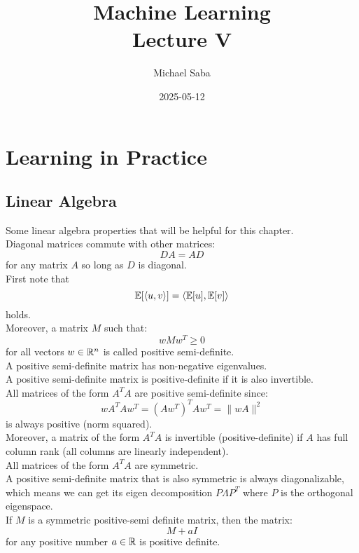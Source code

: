 \documentclass[12pt]{article}
\title{%
    \Huge Machine Learning \\
    \Large Lecture V
}
\date{2025-05-12}
\author{Michael Saba}
\begin{document}
\maketitle
\newpage
\setlength{\parindent}{0pt}

\section*{Learning in Practice}

\subsection*{Linear Algebra}

Some linear algebra properties that
will be helpful for this chapter. \\

Diagonal matrices commute with other matrices:
\[ DA = AD \]
for any matrix $A$ so long as $D$ is diagonal. \\

First note that
\[ \mathbb{E}[\left\langle u, v \right\rangle] = \left\langle \mathbb{E}[u], \mathbb{E}[v] \right\rangle \]
holds. \\

Moreover, a matrix $M$ such that:
\[ wMw^T \geq 0 \]
for all vectors $w \in \mathbb{R}^n$ is called
positive semi-definite. \\
A positive semi-definite matrix
has non-negative eigenvalues. \\

A positive semi-definite matrix is positive-definite
if it is also invertible. \\

All matrices of the form $A^TA$
are positive semi-definite since:
\[ wA^TAw^T = (Aw^T)^TAw^T = \|wA\|^2 \]
is always positive (norm squared). \\

Moreover, a matrix of the form $A^TA$
is invertible (positive-definite)
if $A$ has full column rank (all columns
are linearly independent). \\

All matrices of the form $A^TA$ are symmetric. \\

A positive semi-definite matrix
that is also symmetric is always
diagonalizable, which means we can
get its eigen decomposition $P\Lambda P^T$
where $P$ is the orthogonal eigenspace. \\

If $M$ is a symmetric positive-semi definite matrix,
then the matrix:
\[ M + aI \]
for any positive number $a \in \mathbb{R}$
is positive definite. \\
\end{document}
